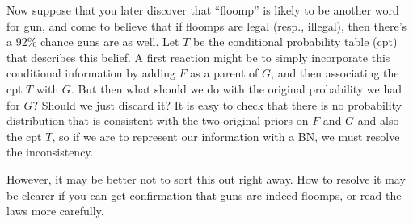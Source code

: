 \documentclass{article}
\numberwithin{equation}{section}
\begin{document}
\begin{notfocus}
\begin{example}
		Now suppose that you later discover that ``floomp'' is likely to be another word for gun, and come to believe that if floomps are legal (resp., illegal), then there's a 92\% chance guns are as well.
		Let $T$ be the conditional probability table (cpt) that describes this belief.
		A first reaction might be to simply incorporate this conditional information by
		adding $F$ as a parent of $G$, and then associating the cpt $T$ with $G$.
		But then what should we do with the original probability we had
		for $G$?  Should we just discard it?
		It is easy to check that there is no probability distribution that is
		consistent with the two original priors on $F$ and $G$ and also the cpt
		$T$, so if we are to represent our information with a BN, we must
		resolve the inconsistency.  
			
%		
However, it may be better not to sort this out right away.
		How to resolve it may be clearer if you can get confirmation
		that guns are indeed floomps, or read the laws more carefully.



\end{example}
\end{notfocus}
\end{document}
